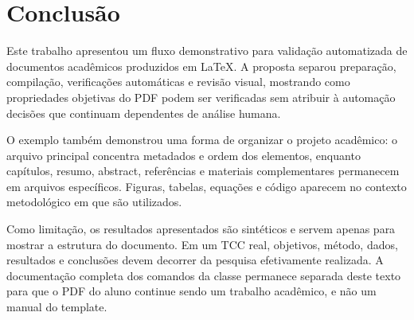 \section{Conclusão}\label{sec:conclusion}

Este trabalho apresentou um fluxo demonstrativo para validação automatizada de documentos acadêmicos produzidos em LaTeX. A proposta separou preparação, compilação, verificações automáticas e revisão visual, mostrando como propriedades objetivas do PDF podem ser verificadas sem atribuir à automação decisões que continuam dependentes de análise humana.

O exemplo também demonstrou uma forma de organizar o projeto acadêmico: o arquivo principal concentra metadados e ordem dos elementos, enquanto capítulos, resumo, abstract, referências e materiais complementares permanecem em arquivos específicos. Figuras, tabelas, equações e código aparecem no contexto metodológico em que são utilizados.

Como limitação, os resultados apresentados são sintéticos e servem apenas para mostrar a estrutura do documento. Em um TCC real, objetivos, método, dados, resultados e conclusões devem decorrer da pesquisa efetivamente realizada. A documentação completa dos comandos da classe permanece separada deste texto para que o PDF do aluno continue sendo um trabalho acadêmico, e não um manual do template.
